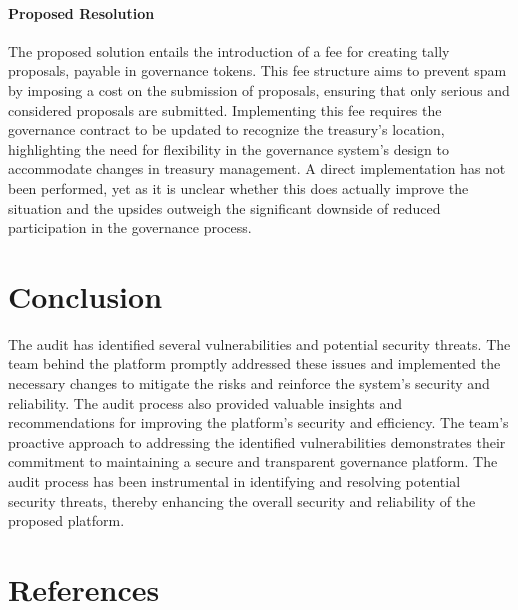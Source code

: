 \documentclass[11pt]{article}
\begin{document}
\paragraph{Proposed Resolution}
The proposed solution entails the introduction of a fee for creating tally proposals, payable in governance tokens.
This fee structure aims to prevent spam by imposing a cost on the submission of proposals, ensuring that only serious and considered proposals are submitted.
Implementing this fee requires the governance contract to be updated to recognize the treasury's location, highlighting the need for flexibility in the governance system's design to accommodate changes in treasury management.
A direct implementation has not been performed, yet as it is unclear whether this does actually improve the situation
and the upsides outweigh the significant downside of reduced participation in the governance process.


\section{Conclusion}

The audit has identified several vulnerabilities and potential security threats.
The team behind the platform promptly addressed these issues and implemented the necessary changes to mitigate the risks and reinforce the system's security and reliability.
The audit process also provided valuable insights and recommendations for improving the platform's security and efficiency.
The team's proactive approach to addressing the identified vulnerabilities demonstrates their commitment to maintaining a secure and transparent governance platform.
The audit process has been instrumental in identifying and resolving potential security threats, thereby enhancing the overall security and reliability of the proposed platform.

\section{References}

\printbibliography
\end{document}
